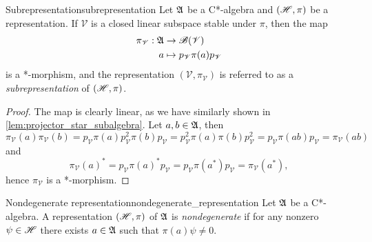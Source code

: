 \begin{proposition}{Subrepresentation}{subrepresentation}
    Let \(\mathfrak{A}\) be a C*-algebra and \((\mathscr{H}, \pi)\) be a representation. If \(\mathscr{V}\) is a closed linear subspace stable under \(\pi\), then the map
    \begin{align*}
        \pi_{\mathscr{V}} : \mathfrak{A} &\to \mathscr{B}(\mathscr{V})\\
                                      a &\mapsto p_\mathscr{V} \pi(a) p_{\mathscr{V}}
    \end{align*}
    is a *-morphism, and the representation \((\mathscr{V}, \pi_{\mathscr{V}})\) is referred to as a \emph{subrepresentation} of \((\mathscr{H}, \pi)\).
\end{proposition}
\begin{proof}
    The map is clearly linear, as we have similarly shown in \cref{lem:projector_star_subalgebra}. Let \(a, b \in \mathfrak{A}\), then
    \begin{equation*}
        \pi_{\mathscr{V}}(a)\pi_{\mathscr{V}}(b) = p_{\mathscr{V}} \pi(a) p_{\mathscr{V}}^2 \pi(b) p_{\mathscr{V}} = p_{\mathscr{V}}^2 \pi(a)\pi(b) p_{\mathscr{V}}^2 = p_{\mathscr{V}} \pi(ab) p_\mathscr{V} = \pi_{\mathscr{V}}(ab)
    \end{equation*}
    and
    \begin{equation*}
        \pi_{\mathscr{V}}(a)^* = p_{\mathscr{V}} \pi(a)^* p_{\mathscr{V}} = p_{\mathscr{V}}\pi(a^*) p_{\mathscr{V}} = \pi_{\mathscr{V}}(a^*),
    \end{equation*}
    hence \(\pi_\mathscr{V}\) is a *-morphism.
\end{proof}

\begin{definition}{Nondegenerate representation}{nondegenerate_representation}
    Let \(\mathfrak{A}\) be a C*-algebra. A representation \((\mathscr{H}, \pi)\) of \(\mathfrak{A}\) is \emph{nondegenerate} if for any nonzero \(\psi \in \mathscr{H}\) there exists \(a \in \mathfrak{A}\) such that \(\pi(a)\psi \neq 0\).
\end{definition}

